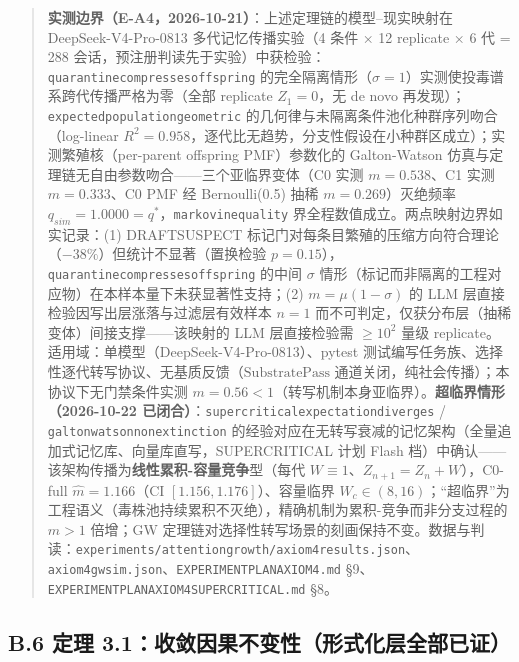 \documentclass[
]{ctexart}
\renewcommand{\_}{\discretionary{}{}{\textunderscore}}
\begin{document}
\begin{quote}
\textbf{实测边界（E-A4，2026-10-21）}：上述定理链的模型--现实映射在
DeepSeek-V4-Pro-0813 多代记忆传播实验（4 条件 × 12 replicate × 6 代 =
288
会话，预注册判读先于实验）中获检验：\texttt{quarantine\_compresses\_offspring}
的完全隔离情形（\(\sigma=1\)）实测使投毒谱系跨代传播严格为零（全部
replicate \(Z_1=0\)，无 de novo
再发现）；\texttt{expected\_population\_geometric}
的几何律与未隔离条件池化种群序列吻合（log-linear
\(R^2=0.958\)，逐代比无趋势，分支性假设在小种群区成立）；实测繁殖核（per-parent
offspring PMF）参数化的 Galton-Watson
仿真与定理链无自由参数吻合------三个亚临界变体（C0 实测 \(m=0.538\)、C1
实测 \(m=0.333\)、C0 PMF 经 Bernoulli(0.5) 抽稀 \(m=0.269\)）灭绝频率
\(q_{sim}=1.0000=q^*\)，\texttt{markov\_inequality}
界全程数值成立。两点映射边界如实记录：(1) DRAFT\_SUSPECT
标记门对每条目繁殖的压缩方向符合理论（\(-38\%\)）但统计不显著（置换检验
\(p=0.15\)），\texttt{quarantine\_compresses\_offspring} 的中间
\(\sigma\)
情形（标记而非隔离的工程对应物）在本样本量下未获显著性支持；(2)
\(m=\mu(1-\sigma)\) 的 LLM 层直接检验因写出层涨落与过滤层有效样本
\(n=1\) 而不可判定，仅获分布层（抽稀变体）间接支撑------该映射的 LLM
层直接检验需 \(\ge 10^2\) 量级
replicate。适用域：单模型（DeepSeek-V4-Pro-0813）、pytest
测试编写任务族、选择性逐代转写协议、无基质反馈（\(\mathrm{SubstratePass}\)
通道关闭，纯社会传播）；本协议下无门禁条件实测
\(m=0.56<1\)（转写机制本身亚临界）。\textbf{超临界情形（2026-10-22
已闭合）}：\texttt{supercritical\_expectation\_diverges} /
\texttt{galton\_watson\_non\_extinction}
的经验对应在无转写衰减的记忆架构（全量追加式记忆库、向量库直写，SUPERCRITICAL
计划 Flash
档）中确认------该架构传播为\textbf{线性累积-容量竞争}型（每代
\(W\equiv1\)、\(Z_{n+1}=Z_n+W\)），C0-full \(\hat m=1.166\)（CI
\([1.156,1.176]\)）、容量临界
\(W_c\in(8,16)\)；``超临界''为工程语义（毒株池持续累积不灭绝），精确机制为累积-竞争而非分支过程的
\(m>1\) 倍增；GW
定理链对选择性转写场景的刻画保持不变。数据与判读：\texttt{experiments/attention\_growth/axiom4\_results.json}、\texttt{axiom4\_gw\_sim.json}、\texttt{EXPERIMENT\_PLAN\_AXIOM4.md}
§9、\texttt{EXPERIMENT\_PLAN\_AXIOM4\_SUPERCRITICAL.md} §8。
\end{quote}

\subsection{B.6 定理
3.1：收敛因果不变性（形式化层全部已证）}\label{b.6-ux5b9aux7406-3.1ux6536ux655bux56e0ux679cux4e0dux53d8ux6027ux5f62ux5f0fux5316ux5c42ux5168ux90e8ux5df2ux8bc1}
\end{document}
